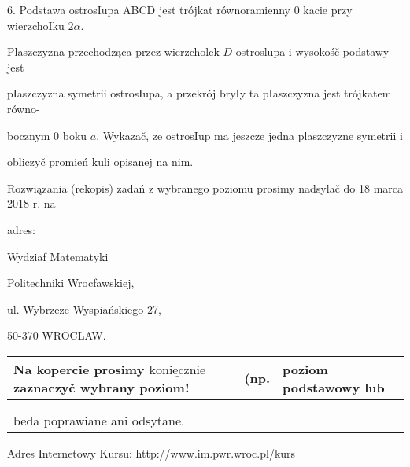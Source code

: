 \documentclass[a4paper,12pt]{article}
\begin{document}
6. Podstawa ostrosIupa ABCD jest trójkat równoramienny $0$ kacie przy wierzchoIku $2\alpha.$

Plaszczyzna przechodząca przez wierzcholek $D$ ostroslupa $\mathrm{i}$ wysokośč podstawy jest

pIaszczyzna symetrii ostrosIupa, a przekrój bryIy ta pIaszczyzna jest trójkatem równo-

bocznym $0$ boku $a$. Wykazač, $\dot{\mathrm{z}}\mathrm{e}$ ostrosIup ma jeszcze jedna plaszczyzne symetrii $\mathrm{i}$

obliczyč promień kuli opisanej na nim.

Rozwiązania (rekopis) zadań z wybranego poziomu prosimy nadsylač do 18 marca 2018 r. na

adres:

Wydziaf Matematyki

Politechniki Wrocfawskiej,

ul. Wybrzeze Wyspiańskiego 27,

50-370 WROCLAW.
\begin{center}
\begin{tabular}{|l|l|l|}
\hline
\multicolumn{1}{|l|}{Na kopercie prosimy $\underline{\mathrm{k}\mathrm{o}\mathrm{n}\mathrm{i}\mathrm{e}\mathrm{c}\mathrm{z}\mathrm{n}\mathrm{i}\mathrm{e}}$ zaznaczyč wybrany poziom!}&	\multicolumn{1}{|l|}{(np.}&	\multicolumn{1}{|l|}{poziom podstawowy lub}	\\
\hline
	\\
	\\
\multicolumn{1}{|l|}{beda poprawiane ani odsytane.}	\\
\cline{1-1}
\end{tabular}

\end{center}
Adres Internetowy Kursu: http://www.im.pwr.wroc.pl/kurs
\end{document}
